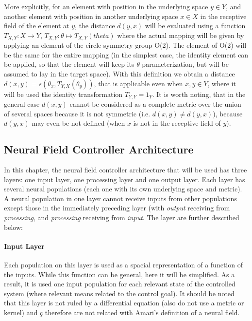 More explicitly, for an element with position in the underlying space
$y \in Y$, and another element with position in another underlying
space $x \in X$ in the receptive field of the element at $y$, the
distance $d(y,x)$ will be evaluated using a function $T_{X,Y}: X
\rightarrow Y$, $T_{X,Y}:\theta \mapsto T_{X,Y}(theta)$ where the
actual mapping will be given by applying an element of the circle
symmetry group O(2). The element of O(2) will be the same for the
entire mapping (in the simplest case, the identity element can be
applied, so that the element will keep its $\theta$ parameterization,
but will be assumed to lay in the target space). With this definition
we obtain a distance $d(x,y)=s(\theta_x,T_{Y,X}(\theta_y))$, that is
applicable even when $x,y \in Y$, where it will be used the identity
transformation $T_{Y,Y}=1_Y$. It is worth noting, that in the general
case $d(x,y)$ cannot be considered as a complete metric over the union
of several spaces because it is not symmetric (i.e. $d(x,y) \neq
d(y,x)$), because $d(y,x)$ may even be not defined (when $x$ is not in
the receptive field of $y$).


\subsection{Neural Field Controller Architecture}
In this chapter, the neural field controller architecture that will be
used has three layers: one input layer, one processing layer and one
output layer. Each layer has several neural populations (each one with
its own underlying space and metric). A neural population in one layer
cannot receive inputs from other populations except those in the
immediately preceding layer (with \emph{output} receiving from
\emph{processing}, and \emph{processing} receiving from
\emph{input}. The layer are further described below:

\paragraph{Input Layer}
Each population on this layer is used as a spacial representation of a
function of the inputs. While this function can be general, here it
will be simplified. As a result, it is used one input population for
each relevant state of the controlled system (where relevant means
related to the control goal). It should be noted that this layer is
not ruled by a differential equation (also do not use a metric or
kernel) and ç therefore are not related with Amari's definition of a
neural field.

